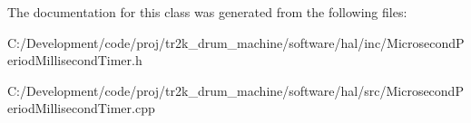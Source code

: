 The documentation for this class was generated from the following files\+:\begin{DoxyCompactItemize}
\item 
C\+:/\+Development/code/proj/tr2k\+\_\+drum\+\_\+machine/software/hal/inc/Microsecond\+Period\+Millisecond\+Timer.\+h\item 
C\+:/\+Development/code/proj/tr2k\+\_\+drum\+\_\+machine/software/hal/src/Microsecond\+Period\+Millisecond\+Timer.\+cpp\end{DoxyCompactItemize}
